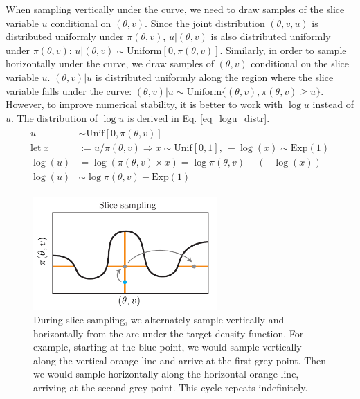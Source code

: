 \documentclass[12pt]{article}
\begin{document}
When sampling vertically under the curve, we need to draw samples of the slice variable $u$ conditional on $(\theta, v)$. Since the joint distribution $(\theta, v, u)$ is distributed uniformly under $\pi(\theta, v)$, $u|(\theta, v)$ is also distributed uniformly under $\pi(\theta, v)$: $u|(\theta, v) \sim \text{Uniform}[0, \pi(\theta, v)]$. Similarly, in order to sample horizontally under the curve, we draw samples of $(\theta, v)$ conditional on the slice variable $u$. $(\theta, v)|u$ is distributed uniformly along the region where the slice variable falls under the curve: $(\theta, v) | u \sim \text{Uniform}\{(\theta, v), \pi(\theta, v) \geq u\}$. However, to improve numerical stability, it is better to work with $\log u$ instead of $u$. The distribution of $\log u$ is derived in Eq. \ref{eq_logu_distr}.
\begin{align}
\begin{split}
u &\sim \text{Unif}[0, \pi(\theta, v)] \\
\text{let} \ x &:= u/\pi(\theta, v) \Rightarrow x \sim \text{Unif}[0, 1], \  -\log(x) \sim \text{Exp}(1) \\
\log(u) &= \log(\pi(\theta, v) \times x) = \log\pi(\theta, v) - (-\log(x)) \\
\log(u) &\sim \log \pi(\theta, v) - \text{Exp}(1)
\end{split}
\label{eq_logu_distr}
\end{align}

\begin{figure}[H]
\centering
\includegraphics[width=7cm]{illustrations/slice_sampling.pdf}
\caption{During slice sampling, we alternately sample vertically and horizontally from the are under the target density function. For example, starting at the blue point, we would sample vertically along the vertical orange line and arrive at the first grey point. Then we would sample horizontally along the horizontal orange line, arriving at the second grey point. This cycle repeats indefinitely.}
\label{fig_slice_sampling}
\end{figure}
\end{document}

